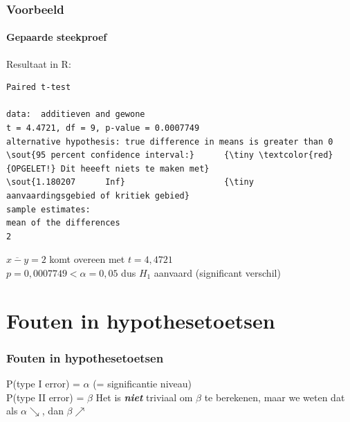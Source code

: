\documentclass{beamer}
\begin{document}
\begin{frame}[fragile]
  \frametitle{Voorbeeld}
  \framesubtitle{Gepaarde steekproef}
Resultaat in R:
{\footnotesize
\begin{Verbatim}[commandchars=\\\{\}]
Paired t-test

data:  additieven and gewone
t = 4.4721, df = 9, p-value = 0.0007749
alternative hypothesis: true difference in means is greater than 0
\sout{95 percent confidence interval:}      {\tiny \textcolor{red}{OPGELET!} Dit heeeft niets te maken met}
\sout{1.180207      Inf}                    {\tiny   aanvaardingsgebied of kritiek gebied}
sample estimates:
mean of the differences 
2
\end{Verbatim}
}
\vfill
$\overline{x-y}=2$ komt overeen met $t=4,4721$\\
$p = 0,0007749 < \alpha = 0,05$ dus $H_1$ aanvaard (significant verschil)
\end{frame}

\section{Fouten in hypothesetoetsen}
\sectionframelogo{}

\begin{frame}
  \frametitle{Fouten in hypothesetoetsen}

  \begin{table}
    \centering
    \caption{Mogelijke fouten bij het trekken van conclusies uit statistische toetsen.}
    \label{tab:hypfouten}
  \end{table}
\vfill
P(type I error) = $\alpha$ (= significantie niveau)\\
P(type II error) = $\beta$
\vfill
Het is \textbf{\textit{niet}} triviaal om $\beta$ te berekenen,
maar we weten dat als $\alpha \searrow$, dan $\beta \nearrow$ 
\end{frame}
\end{document}
